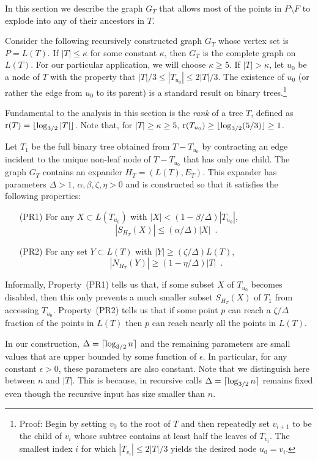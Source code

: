 \documentclass{patmorin}
\DeclareMathOperator{\rank}{r}
\begin{document}
In this section we describe the graph $G_T$ that allows most of the
points in $P\setminus F$ to explode into any of their ancestors in $T$.

Consider the following recursively constructed graph $G_{T}$ whose vertex set
is $P=L(T)$.  If $|T| \le \kappa$ for some constant $\kappa$, then $G_T$
is the complete graph on $L(T)$. For our particular application, we will
choose $\kappa\ge 5$.  
If $|T|>\kappa$, let $u_0$ be a node of $T$ with the property that
$|T|/3\le |T_{u_0}|\le 2|T|/3$.  The existence of $u_0$ (or rather
the edge from $u_0$ to its parent) is a standard result on binary
trees.\footnote{Proof: Begin by setting $v_0$ to the root of $T$ and then
repeatedly set $v_{i+1}$ to be the child of $v_i$ whose subtree contains
at least half the leaves of $T_{v_i}$.  The smallest index $i$ for which
$|T_{v_i}|\le 2|T|/3$ yields the desired node $u_0=v_i$.} 

Fundamental to the analysis in this section is the \emph{rank} of a
tree $T$, defined as $\rank(T)=\floor{\log_{3/2}|T|}$.  Note that, for
$|T|\ge\kappa\ge 5$, $\rank(T_{u_0}) \ge \floor{\log_{3/2}(5/3)} \ge 1$.

Let $T_1$ be the full binary tree obtained from $T-T_{u_0}$ by contracting
an edge incident to the unique non-leaf node of $T-T_{u_0}$ that has only
one child.  The graph $G_{T}$ contains an expander $H_T=(L(T),E_T)$. This
expander has parameters $\Delta>1$, $\alpha, \beta,\zeta,\eta > 0$ and is
constructed so that it satisfies the following properties:
\begin{enumerate}
  \item[(PR1)] For any $X\subset L(T_{u_0})$ with
    $|X|<(1-\beta/\Delta)|T_{u_0}|$, 
    \[ |S_{H_T}(X)|\le (\alpha/\Delta)|X| \enspace . \]

  \item[(PR2)] For any set $Y\subset L(T)$ with $|Y|\ge
    (\zeta/\Delta)L(T)$, \[ |N_{H_T}(Y)|\ge (1-\eta/\Delta)|T| \enspace .\]
\end{enumerate}
Informally, Property~(PR1) tells us that, if some subset $X$ of
$T_{u_0}$ becomes disabled, then this only prevents a much smaller subset
$S_{H_T}(X)$ of $T_{1}$ from accessing $T_{u_0}$.  Property~(PR2) tells
us that if some point $p$ can reach a $\zeta/\Delta$ fraction of the
points in $L(T)$ then $p$ can reach nearly all the points in $L(T)$.

In our construction, $\Delta={\lceil \log_{3/2} n \rceil}$ and the remaining
parameters are small values that are upper bounded by some function
of $\epsilon$. In particular, for any constant $\epsilon >0$, these
parameters are also constant. Note that we distinguish here between $n$
and $|T|$. This is because, in recursive calls $\Delta={\lceil \log_{3/2} n \rceil}$
remains fixed even though the recursive input has size smaller than $n$.
\end{document}
